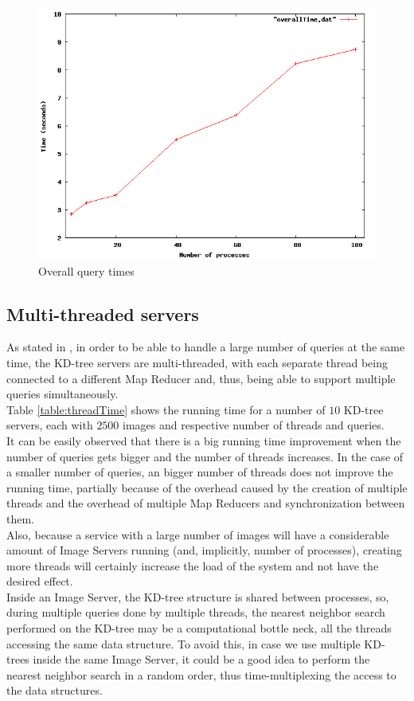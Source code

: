 \begin{figure}[H]
\centering
\includegraphics[width=.8\linewidth]{images/overallTime.png}
\caption{Overall query times}
\label{fig:overallTime}
\end{figure}

\subsection{Multi-threaded servers}

As stated in , in order to be able to handle a large number of queries at the same time, the KD-tree servers are multi-threaded, with each separate thread being connected to a different Map Reducer and, thus, being able to support multiple queries simultaneously.\\
Table \ref{table:threadTime} shows the running time for a number of $10$ KD-tree servers, each with $2500$ images and respective number of threads and queries.\\
It can be easily observed that there is a big running time improvement when the number of queries gets bigger and the number of threads increases. In the case of a smaller number of queries, an bigger number of threads does not improve the running time, partially because of the overhead caused by the creation of multiple threads and the overhead of multiple Map Reducers and synchronization between them. \\
Also, because a service with a large number of images will have a considerable amount of Image Servers running (and, implicitly, number of processes), creating more threads will certainly increase the load of the system and not have the desired effect.\\
Inside an Image Server, the KD-tree structure is shared between processes, so, during multiple queries done by multiple threads, the nearest neighbor search performed on the KD-tree may be
a computational bottle neck, all the threads accessing the same data structure.
To avoid this, in case we use multiple KD-trees inside the same Image Server, it could be a good idea to perform the nearest neighbor search in a random order, thus time-multiplexing the access to the data structures.\\

